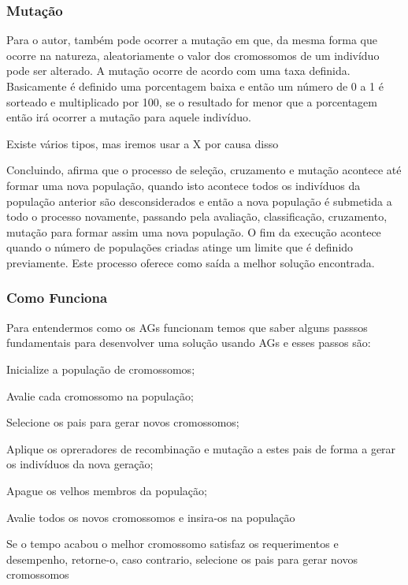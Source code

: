\subsubsection{Mutação}

\par Para o autor, também pode ocorrer a mutação em
que, da mesma forma que ocorre na natureza, aleatoriamente o valor dos
cromossomos de um indivíduo pode ser alterado. A mutação ocorre de acordo com
uma taxa definida. Basicamente é definido uma porcentagem baixa e então um
número de 0 a 1 é sorteado e multiplicado por 100, se o resultado for menor que
a porcentagem então irá ocorrer a mutação para aquele indivíduo.

Existe vários tipos, mas iremos usar a X por causa disso

\par Concluindo,  afirma que o processo de 
seleção, cruzamento e mutação acontece até formar uma nova população, 
quando isto acontece todos os indivíduos da população anterior são
desconsiderados e então a nova população é submetida a todo o processo
novamente, passando pela avaliação, classificação, cruzamento, mutação para
formar assim uma nova população. O fim da execução acontece quando o
número de populações criadas atinge um limite que é definido previamente.
Este processo oferece como saída a melhor solução encontrada.


\subsubsection{Como Funciona}

\par Para entendermos como os AGs funcionam temos que saber alguns passsos
fundamentais para desenvolver uma solução usando AGs e esses passos são:
\item Inicialize a população de cromossomos;
\item Avalie cada cromossomo na população;
\item Selecione os pais para gerar novos cromossomos;
\item Aplique os opreradores de recombinação e mutação a estes pais de forma a
gerar os indivíduos da nova geração;
\item Apague os velhos membros da população;
\item Avalie todos os novos cromossomos e insira-os na população
\item Se o tempo acabou o melhor cromossomo satisfaz os requerimentos e
desempenho, retorne-o, caso contrario, selecione os pais para gerar novos
cromossomos

